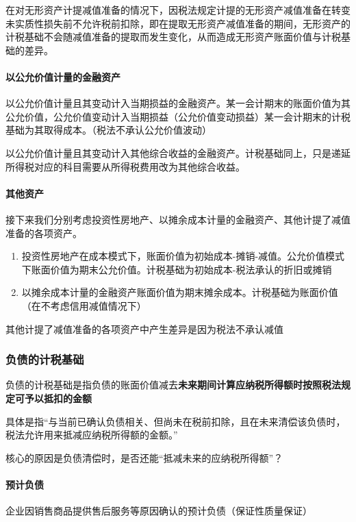 \documentclass[UTF8,12pt]{ctexart}
\numberwithin{equation}{section} %
\numberwithin{figure}{section}
\numberwithin{table}{section}
\begin{document}
	在对无形资产计提减值准备的情况下，因税法规定计提的无形资产减值准备在转变未实质性损失前不允许税前扣除，即在提取无形资产减值准备的期间，无形资产的计税基础不会随减值准备的提取而发生变化，从而造成无形资产账面价值与计税基础的差异。
	
	\paragraph{以公允价值计量的金融资产}
	以公允价值计量且其变动计入当期损益的金融资产。某一会计期末的账面价值为其公允价值，公允价值变动计入当期损益（公允价值变动损益）某一会计期末的计税基础为其取得成本。（税法不承认公允价值波动）
	
	以公允价值计量且其变动计入其他综合收益的金融资产。计税基础同上，只是递延所得税对应的科目需要从所得税费用改为其他综合收益。
	
	\paragraph{其他资产}
	接下来我们分别考虑投资性房地产、以摊余成本计量的金融资产、其他计提了减值准备的各项资产。
	\begin{enumerate}
		\item 投资性房地产在成本模式下，账面价值为初始成本-摊销-减值。公允价值模式下账面价值为期末公允价值。计税基础为初始成本-税法承认的折旧或摊销
		
		\item 以摊余成本计量的金融资产账面价值为期末摊余成本。计税基础为账面价值（在不考虑信用减值情况下）
	\end{enumerate}
	
	其他计提了减值准备的各项资产中产生差异是因为税法不承认减值
	
	\subsubsection{负债的计税基础}
	负债的计税基础是指负债的账面价值减去\textbf{未来期间计算应纳税所得额时按照税法规定可予以抵扣的金额}
	
	具体是指“与当前已确认负债相关、但尚未在税前扣除，且在未来清偿该负债时，税法允许用来抵减应纳税所得额的金额。”
	
	核心的原因是负债清偿时，是否还能“抵减未来的应纳税所得额”？
	
	\paragraph{预计负债}
	企业因销售商品提供售后服务等原因确认的预计负债（保证性质量保证）
	
\end{document}
